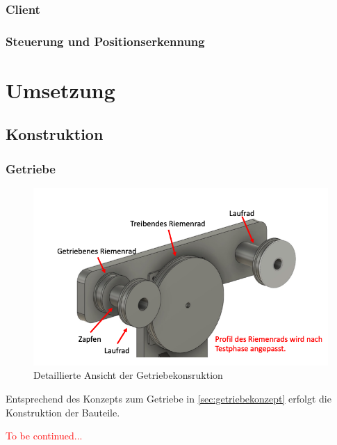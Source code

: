 \subsection{Client}
\subsection{Steuerung und Positionserkennung}

\chapter{Umsetzung}
\section{Konstruktion}
\subsection{Getriebe}
\begin{figure}[h]
	\begin{center}
		\includegraphics[width=17cm]{getriebe.png}
		\caption{Detaillierte Ansicht der Getriebekonsruktion}
		\label{pic:getriebe}
	\end{center}
\end{figure}

Entsprechend des Konzepts zum Getriebe in \autoref{sec:getriebekonzept} erfolgt die Konstruktion der Bauteile.   

\textcolor{red}{To be continued...}

	